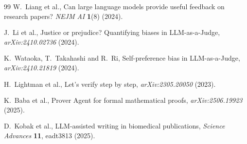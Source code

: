 \documentclass{ws-ijprai}
\begin{document}
\begin{thebibliography}{99}
W.~Liang et al., Can large language models provide useful feedback on
research papers? \textit{NEJM AI} \textbf{1}(8) (2024).

J.~Li et al., Justice or prejudice? Quantifying biases in LLM-as-a-Judge,
\textit{arXiv:2410.02736} (2024).

K.~Wataoka, T.~Takahashi and R.~Ri, Self-preference bias in LLM-as-a-Judge,
\textit{arXiv:2410.21819} (2024).

H.~Lightman et al., Let's verify step by step, \textit{arXiv:2305.20050}
(2023).

K.~Baba et al., Prover Agent for formal mathematical proofs,
\textit{arXiv:2506.19923} (2025).

D.~Kobak et al., LLM-assisted writing in biomedical publications,
\textit{Science Advances} \textbf{11}, eadt3813 (2025).

\end{thebibliography}
\end{document}
